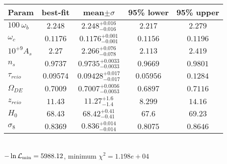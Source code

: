 \begin{tabular}{|l|c|c|c|c|} 
 \hline 
Param & best-fit & mean$\pm\sigma$ & 95\% lower & 95\% upper \\ \hline 
$100~\omega_{b }$ &$2.248$ & $2.248_{-0.016}^{+0.016}$ & $2.217$ & $2.279$ \\ 
$\omega_c$ &$0.1176$ & $0.1176_{-0.001}^{+0.001}$ & $0.1156$ & $0.1196$ \\ 
$10^{+9}A_{s }$ &$2.27$ & $2.266_{-0.078}^{+0.076}$ & $2.113$ & $2.419$ \\ 
$n_{s }$ &$0.9737$ & $0.9735_{-0.0033}^{+0.0033}$ & $0.9669$ & $0.9801$ \\ 
$\tau_{reio }$ &$0.09574$ & $0.09428_{-0.017}^{+0.017}$ & $0.05956$ & $0.1284$ \\ 
$\Omega_{DE}$ &$0.7009$ & $0.7007_{-0.0053}^{+0.0056}$ & $0.6897$ & $0.7116$ \\ 
$z_{reio }$ &$11.43$ & $11.27_{-1.4}^{+1.6}$ & $8.299$ & $14.16$ \\ 
$H_{0 }$ &$68.43$ & $68.42_{-0.41}^{+0.41}$ & $67.6$ & $69.23$ \\ 
$\sigma_8$ &$0.8369$ & $0.836_{-0.014}^{+0.014}$ & $0.8075$ & $0.8646$ \\ 
\hline 
 \end{tabular} \\ 
$-\ln{\cal L}_\mathrm{min} =5988.12$, minimum $\chi^2=1.198e+04$ \\ 
